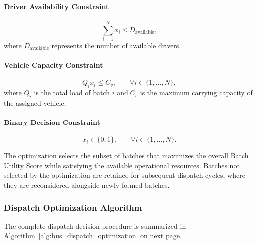 \documentclass{article}
\begin{document}
\paragraph{Driver Availability Constraint}
\begin{equation}
\sum_{i=1}^{N} x_i \le D_{\mathrm{available}},
\end{equation}
where $D_{\mathrm{available}}$ represents the number of available drivers.

\paragraph{Vehicle Capacity Constraint}
\begin{equation}
Q_i x_i \le C_v, \qquad \forall i \in \{1, \ldots, N\},
\end{equation}
where $Q_i$ is the total load of batch $i$ and $C_v$ is the maximum carrying capacity of the assigned vehicle.

\paragraph{Binary Decision Constraint}
\begin{equation}
x_i \in \{0, 1\}, \qquad \forall i \in \{1, \ldots, N\}.
\end{equation}

The optimization selects the subset of batches that maximizes the overall Batch Utility Score while satisfying the available operational resources. Batches not selected by the optimization are retained for subsequent dispatch cycles, where they are reconsidered alongside newly formed batches.

\subsubsection{Dispatch Optimization Algorithm}
\label{subsubsec:dispatch_optimization_algorithm}

The complete dispatch decision procedure is summarized in Algorithm~\ref{alg:bus_dispatch_optimization} on next page.
\end{document}
